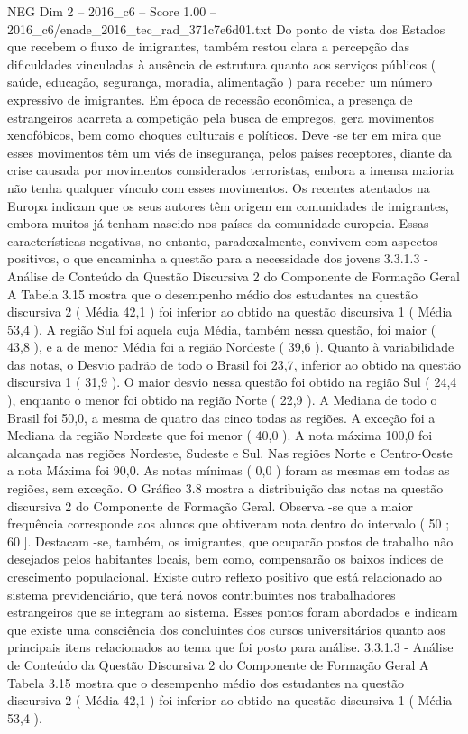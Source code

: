\begin{textsample}{NEG Dim 2 – 2016\_c6 – Score 1.00 – 2016\_c6/enade\_2016\_tec\_rad\_371c7e6d01.txt}
Do ponto de vista dos Estados que recebem o fluxo de imigrantes, também restou clara a percepção das dificuldades vinculadas à ausência de estrutura quanto aos serviços públicos ( saúde, educação, segurança, moradia, alimentação ) para receber um número expressivo de imigrantes.
Em época de recessão econômica, a presença de estrangeiros acarreta a competição pela busca de empregos, gera movimentos xenofóbicos, bem como choques culturais e políticos.
Deve -se ter em mira que esses movimentos têm um viés de insegurança, pelos países receptores, diante da crise causada por movimentos considerados terroristas, embora a imensa maioria não tenha qualquer vínculo com esses movimentos.
Os recentes atentados na Europa indicam que os seus autores têm origem em comunidades de imigrantes, embora muitos já tenham nascido nos países da comunidade europeia.
Essas características negativas, no entanto, paradoxalmente, convivem com aspectos positivos, o que encaminha a questão para a necessidade dos jovens 3.3.1.3 - Análise de Conteúdo da Questão Discursiva 2 do Componente de Formação Geral A Tabela 3.15 mostra que o desempenho médio dos estudantes na questão discursiva 2 ( Média 42,1 ) foi inferior ao obtido na questão discursiva 1 ( Média 53,4 ).
A região Sul foi aquela cuja Média, também nessa questão, foi maior ( 43,8 ), e a de menor Média foi a região Nordeste ( 39,6 ).
Quanto à variabilidade das notas, o Desvio padrão de todo o Brasil foi 23,7, inferior ao obtido na questão discursiva 1 ( 31,9 ).
O maior desvio nessa questão foi obtido na região Sul ( 24,4 ), enquanto o menor foi obtido na região Norte ( 22,9 ).
A Mediana de todo o Brasil foi 50,0, a mesma de quatro das cinco todas as regiões.
A exceção foi a Mediana da região Nordeste que foi menor ( 40,0 ).
A nota máxima 100,0 foi alcançada nas regiões Nordeste, Sudeste e Sul.
Nas regiões Norte e Centro-Oeste a nota Máxima foi 90,0.
As notas mínimas ( 0,0 ) foram as mesmas em todas as regiões, sem exceção.
O Gráfico 3.8 mostra a distribuição das notas na questão discursiva 2 do Componente de Formação Geral.
Observa -se que a maior frequência corresponde aos alunos que obtiveram nota dentro do intervalo ( 50 ; 60 ].
Destacam -se, também, os imigrantes, que ocuparão postos de trabalho não desejados pelos habitantes locais, bem como, compensarão os baixos índices de crescimento populacional.
Existe outro reflexo positivo que está relacionado ao sistema previdenciário, que terá novos contribuintes nos trabalhadores estrangeiros que se integram ao sistema.
Esses pontos foram abordados e indicam que existe uma consciência dos concluintes dos cursos universitários quanto aos principais itens relacionados ao tema que foi posto para análise. 3.3.1.3 - Análise de Conteúdo da Questão Discursiva 2 do Componente de Formação Geral A Tabela 3.15 mostra que o desempenho médio dos estudantes na questão discursiva 2 ( Média 42,1 ) foi inferior ao obtido na questão discursiva 1 ( Média 53,4 ).

\end{textsample}
